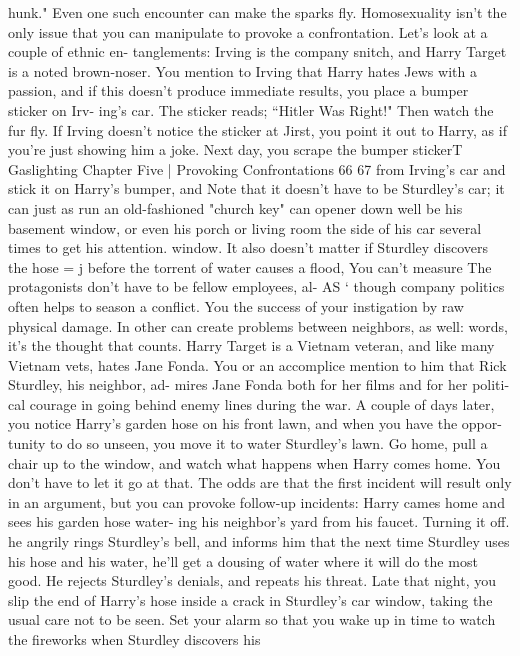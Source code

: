 \documentclass{book}
\begin{document}
hunk." 
Even one such encounter can make the sparks fly. 
Homosexuality isn't the only issue that you can manipulate 
to provoke a confrontation. Let's look at a couple of ethnic en- 
tanglements: 
Irving is the company snitch, and Harry Target is a 
noted brown-noser. You mention to Irving that Harry 
hates Jews with a passion, and if this doesn't produce 
immediate results, you place a bumper sticker on Irv- 
ing’s car. The sticker reads; “Hitler Was Right!" Then 
watch the fur fly. If Irving doesn't notice the sticker at 
Jirst, you point it out to Harry, as if you're just showing 
him a joke. Next day, you scrape the bumper stickerT Gaslighting Chapter Five 
| Provoking Confrontations 
66 67 
from Irving's car and stick it on Harry's bumper, and Note that it doesn't have to be Sturdley's car; it can just as 
run an old-fashioned "church key" can opener down well be his basement window, or even his porch or living room 
the side of his car several times to get his attention. window. It also doesn't matter if Sturdley discovers the hose 
= j before the torrent of water causes a flood, You can't measure The protagonists don't have to be fellow employees, al- AS ‘ though company politics often helps to season a conflict. You the success of your instigation by raw physical damage. In other 
can create problems between neighbors, as well: words, it's the thought that counts. 
Harry Target is a Vietnam veteran, and like many 
Vietnam vets, hates Jane Fonda. You or an accomplice 
mention to him that Rick Sturdley, his neighbor, ad- 
mires Jane Fonda both for her films and for her politi- 
cal courage in going behind enemy lines during the 
war. A couple of days later, you notice Harry's garden 
hose on his front lawn, and when you have the oppor- 
tunity to do so unseen, you move it to water Sturdley's 
lawn. Go home, pull a chair up to the window, and 
watch what happens when Harry comes home. 
You don't have to let it go at that. The odds are that the first 
incident will result only in an argument, but you can provoke 
follow-up incidents: 
Harry cames home and sees his garden hose water- 
ing his neighbor's yard from his faucet. Turning it off. 
he angrily rings Sturdley's bell, and informs him that 
the next time Sturdley uses his hose and his water, he'll 
get a dousing of water where it will do the most good. 
He rejects Sturdley's denials, and repeats his threat. 
Late that night, you slip the end of Harry's hose inside 
a crack in Sturdley's car window, taking the usual care 
not to be seen. Set your alarm so that you wake up in 
time to watch the fireworks when Sturdley discovers his 
\end{document}

